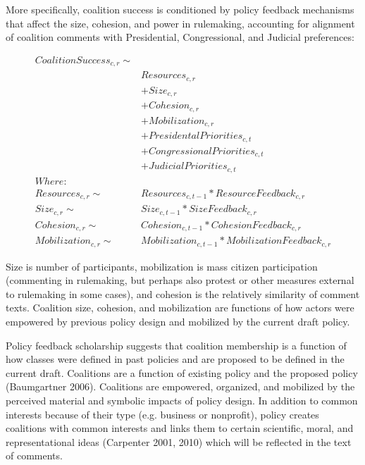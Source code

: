 More specifically, coalition success is conditioned by policy feedback mechanisms that affect the size, cohesion, and power in rulemaking, accounting for alignment of coalition comments with Presidential, Congressional, and Judicial preferences: 

\begin{align*}
CoalitionSuccess_{c, r} \sim &\\
& Resources_{c, r}  \\
& + Size_{c, r}  \\
& + Cohesion_{c, r} \\
& + Mobilization_{c, r}  \\
& + PresidentalPriorities_{c, t}  \\
& + CongressionalPriorities_{c, t}  \\
& + JudicialPriorities_{c, t}\\
Where: \\
Resources_{c, r} \sim & Resources_{c, t-1}* ResourceFeedback_{c, r}\\
Size_{c, r} \sim & Size_{c, t-1}* SizeFeedback_{c, r}\\
Cohesion_{c, r}  \sim & Cohesion_{c, t-1}* CohesionFeedback_{c, r}\\
Mobilization_{c, r}  \sim & Mobilization_{c, t-1}*MobilizationFeedback_{c, r}
\end{align*}

Size is number of participants, mobilization is mass citizen participation (commenting in rulemaking, but perhaps also protest or other measures external to rulemaking in some cases), and cohesion is the relatively similarity of comment texts. Coalition size, cohesion, and mobilization are functions of how actors were empowered by previous policy design and mobilized by the current draft policy. 

Policy feedback scholarship suggests that coalition membership is a function of how classes were defined in past policies and are proposed to be defined in the current draft. Coalitions are a function of existing policy and the proposed policy (Baumgartner 2006). Coalitions are empowered, organized, and mobilized by the perceived material and symbolic impacts of policy design. In addition to common interests because of their type (e.g. business or nonprofit), policy creates coalitions with common interests and links them to certain scientific, moral, and representational ideas (Carpenter 2001, 2010) which will be reflected in the text of comments.%

